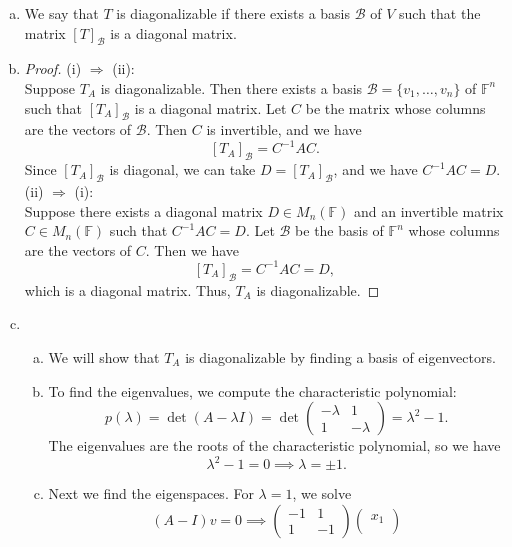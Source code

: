 \documentclass{article}
\begin{document}
\begin{enumerate}[(a)]
    \item We say that $T$ is diagonalizable if there exists a basis $\mathscr{B}$ of $V$ such that the matrix $[T]_{\mathscr{B}}$ is a diagonal matrix.
    \item \begin{proof}
        (i) $\Rightarrow$ (ii): \\
        Suppose $T_A$ is diagonalizable. Then there exists a basis $\mathscr{B} = \{v_1, \ldots, v_n\}$ of $\mathbb{F}^n$ such that $[T_A]_{\mathscr{B}}$ is a diagonal matrix. Let $C$ be the matrix whose columns are the vectors of $\mathscr{B}$. Then $C$ is invertible, and we have
        \[
        [T_A]_{\mathscr{B}} = C^{-1} A C.
        \]
        Since $[T_A]_{\mathscr{B}}$ is diagonal, we can take $D = [T_A]_{\mathscr{B}}$, and we have $C^{-1} A C = D$. \\
        (ii) $\Rightarrow$ (i): \\
        Suppose there exists a diagonal matrix $D \in M_n(\mathbb{F})$ and an invertible matrix $C \in M_n(\mathbb{F})$ such that $C^{-1} A C = D$. Let $\mathscr{B}$ be the basis of $\mathbb{F}^n$ whose columns are the vectors of $C$. Then we have
        \[
        [T_A]_{\mathscr{B}} = C^{-1} A C = D,
        \]
        which is a diagonal matrix. Thus, $T_A$ is diagonalizable.
    \end{proof}
    \item 
    \begin{enumerate}[(a)]
        \item We will show that $T_A$ is diagonalizable by finding a basis of eigenvectors. 
        \item To find the eigenvalues, we compute the characteristic polynomial:
        \[
        p(\lambda) = \det(A - \lambda I) = \det\begin{pmatrix}
            -\lambda & 1 \\
            1 & -\lambda
        \end{pmatrix} = \lambda^2 - 1.
        \]
        The eigenvalues are the roots of the characteristic polynomial, so we have
        \[
        \lambda^2 - 1 = 0 \implies \lambda = \pm 1.
        \]
        \item Next we find the eigenspaces. For $\lambda = 1$, we solve
        \[
        (A - I)v = 0 \implies \begin{pmatrix}
            -1 & 1 \\
            1 & -1
        \end{pmatrix} \begin{pmatrix}x_1 \\

\end{pmatrix}\]
\end{enumerate}
\end{enumerate}
\end{document}

